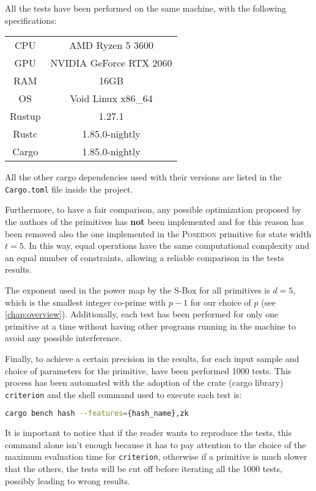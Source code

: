 \documentclass[12pt, a4paper]{report}
\begin{document}
All the tests have been performed on the same machine, with the following specifications:
\begin{table}[H]
    \centering
    \begin{tabular}{|c||c|}
      \hline
        CPU & AMD Ryzen 5 3600 \\
        GPU & NVIDIA GeForce RTX 2060 \\
        RAM & 16GB \\
        OS & Void Linux x86\_64 \\
        \hline
        Rustup & 1.27.1 \\
        Rustc & 1.85.0-nightly \\
        Cargo & 1.85.0-nightly \\
      \hline
    \end{tabular}
    \label{tab:machinespecs}
\end{table}
All the other cargo dependencies used with their versions are listed in the \texttt{Cargo.toml} file inside the project.

Furthermore, to have a fair comparison, any possible optimization proposed by the authors of the primitives has \textbf{not} been implemented and for this reason has been removed also the one implemented in the \textsc{Poseidon} primitive for state width $t = 5$.
In this way, equal operations have the same computational complexity and an equal number of constraints, allowing a reliable comparison in the tests results.

The exponent used in the power map by the S-Box for all primitives is $d = 5$, which is the smallest integer co-prime with $p-1$ for our choice of $p$ (see \autoref{chap:overview}).
Additionally, each test has been performed for only one primitive at a time without having other programs running in the machine to avoid any possible interference.

Finally, to achieve a certain precision in the results, for each input sample and choice of parameters for the primitive, have been performed 1000 tests.
This process has been automated with the adoption of the crate (cargo library) \texttt{criterion} and the shell command used to execute each test is:
\begin{lstlisting}[language=bash]
  cargo bench hash --features={hash_name},zk
\end{lstlisting}
It is important to notice that if the reader wants to reproduce the tests, this command alone isn't enough because it has to pay attention to the choice of the maximum evaluation time for \texttt{criterion}, otherwise if a primitive is much slower that the others, the tests will be cut off before iterating all the 1000 tests, possibly leading to wrong results.
\end{document}
